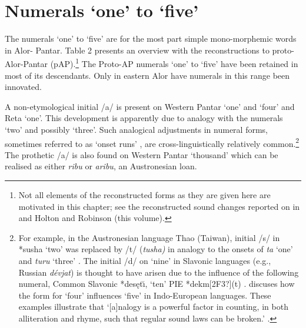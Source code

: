\section{Numerals `one' to `five'}
The numerals `one' to `five' are for the most part simple mono-morphemic words in Alor- Pantar. Table 2 presents an overview with the reconstructions to proto-Alor-Pantar (pAP).\footnote{{}   Not all elements of the reconstructed forms as they are given here are motivated in this chapter; see the reconstructed sound changes reported on in \citet{HoltonEtAl2012} and Holton and Robinson (this volume).}  The Proto-AP numerals `one' to `five' have been retained in most of its descendants. Only in eastern Alor have numerals in this range been innovated.

A non-etymological initial /a/ is present on Western Pantar `one' and `four' and Reta `one'. This development is apparently due to analogy with the numerals `two' and possibly `three'. Such analogical adjustments in numeral forms, sometimes referred to as `onset runs' \citep{Matisoff1995}, are cross-linguistically relatively common.\footnote{{}   For example, in the Austronesian language Thao (Taiwan), initial /s/ in *susha `two' was replaced by /t/ (\textit{tusha)} in analogy to the onsets of \textit{ta} `one' and \textit{turu} `three' \citep[274]{Blust2009}. The initial /d/ on `nine' in Slavonic languages (e.g., Russian \textit{d\'evjat}) is thought to have arisen due to the influence of the following numeral, Common Slavonic *des\k{e}t\u{\i}, `ten' PIE *dekm[2F3?](t) \citep[760]{Comrie1992}. \citet{Winter1964} discuses how the form for `four' influences `five' in Indo-European languages. These examples illustrate that `[a]nalogy is a powerful factor in counting, in both alliteration and rhyme, such that regular sound laws can be broken.' \citep[256]{Sidwell1999}.} The prothetic /a/ is also found on Western Pantar `thousand' which can be realised as either \textit{ribu} or \textit{aribu}, an Austronesian loan.

